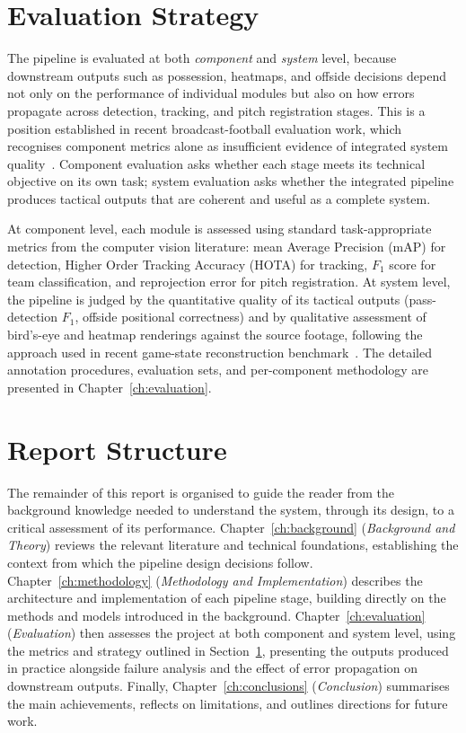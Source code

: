 \section{Evaluation Strategy}
\label{sec:eval-strategy}

The pipeline is evaluated at both \emph{component} and \emph{system}
level, because downstream outputs such as possession, heatmaps, and
offside decisions depend not only on the performance of individual
modules but also on how errors propagate across detection, tracking,
and pitch registration stages. This is a position established in recent
broadcast-football evaluation work, which recognises component
metrics alone as insufficient evidence of integrated system
quality~\cite{Theiner2022,Somers2024}. Component evaluation asks
whether each stage meets its technical objective on its own task;
system evaluation asks whether the integrated pipeline produces
tactical outputs that are coherent and useful as a complete system.

At component level, each module is assessed using standard
task-appropriate metrics from the computer vision literature: mean
Average Precision (mAP) for detection, Higher Order Tracking Accuracy (HOTA) for tracking, $F_1$ score for team
classification, and reprojection error for pitch registration. At
system level, the pipeline is judged by the quantitative quality of
its tactical outputs (pass-detection $F_1$, offside positional
correctness) and by qualitative assessment of bird's-eye and heatmap
renderings against the source footage, following the approach used in
recent game-state reconstruction benchmark~\cite{Somers2024}. The
detailed annotation procedures, evaluation sets, and per-component
methodology are presented in Chapter~\ref{ch:evaluation}.

\section{Report Structure}
\label{sec:report-structure}

The remainder of this report is organised to guide the reader from the 
background knowledge needed to understand the system, through its design, 
to a critical assessment of its performance. Chapter~\ref{ch:background} 
(\emph{Background and Theory}) reviews the relevant literature and technical 
foundations, establishing the context from which the pipeline design decisions 
follow. Chapter~\ref{ch:methodology} (\emph{Methodology and Implementation}) 
describes the architecture and implementation of each pipeline stage, building 
directly on the methods and models introduced in the background. 
Chapter~\ref{ch:evaluation} (\emph{Evaluation}) then assesses the project at 
both component and system level, using the metrics and strategy outlined in 
Section~\ref{sec:eval-strategy}, presenting the outputs produced in practice 
alongside failure analysis and the effect of error propagation on downstream 
outputs. Finally, Chapter~\ref{ch:conclusions} (\emph{Conclusion}) summarises 
the main achievements, reflects on limitations, and outlines directions for 
future work.